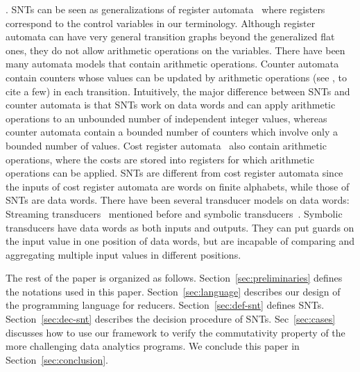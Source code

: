 .
SNTs can be seen as generalizations of register automata~\cite{KF94,NSV04} where registers correspond to the control variables in our terminology. Although register automata can have very general transition graphs beyond the generalized flat ones, they do not allow arithmetic operations on the variables. There have been many automata models that contain arithmetic operations. Counter automata contain counters whose values can be updated by arithmetic operations (see \cite{Iba78,CJ98,LS06,HH14,FGH13}, to cite a few) in each transition.  Intuitively, the major difference between SNTs and counter automata is that SNTs work on data words and can apply arithmetic operations to an unbounded number of independent integer values, whereas  counter automata contain a bounded number of counters which involve only  a bounded number of values. Cost register automata~\cite{ADD+13} also contain arithmetic operations, where the costs are stored into registers for which arithmetic operations can be applied. SNTs are different from cost register automata since the inputs of cost register automata are words on finite alphabets, while those of SNTs are data words. 
%
%
There have been several transducer models on data words: Streaming transducers~\cite{RP11} mentioned before and symbolic transducers~\cite{VHL+12}. Symbolic transducers have data words as both inputs and outputs. They can put guards on the input value in one position of data words, but are incapable of comparing and aggregating multiple input values in different positions. 

The rest of the paper is organized as follows. Section~\ref{sec:preliminaries} defines the notations used in this paper. Section~\ref{sec:language} describes our design of the programming language for reducers. Section~\ref{sec:def-snt} defines SNTs. Section~\ref{sec:dec-snt} describes the decision procedure of SNTs. Sec~\ref{sec:cases} discusses how to use our framework to verify the commutativity property of the more challenging data analytics programs. We conclude this paper in Section~\ref{sec:conclusion}. 